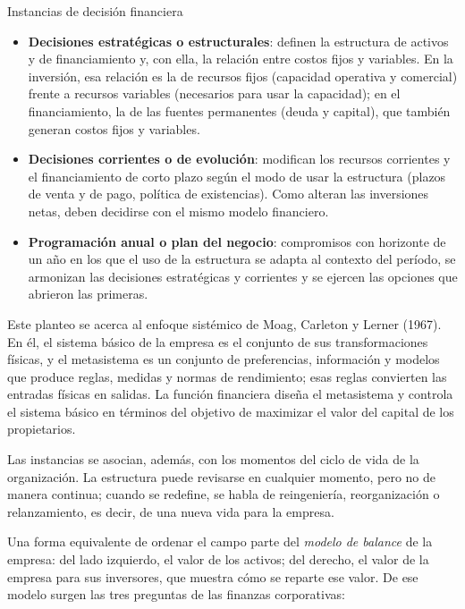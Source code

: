 \begin{definicion}{Instancias de decisión financiera}
\begin{itemize}
\item \textbf{Decisiones estratégicas o estructurales}: definen la estructura de activos y de financiamiento y, con ella, la relación entre costos fijos y variables. En la inversión, esa relación es la de recursos fijos (capacidad operativa y comercial) frente a recursos variables (necesarios para usar la capacidad); en el financiamiento, la de las fuentes permanentes (deuda y capital), que también generan costos fijos y variables.
\item \textbf{Decisiones corrientes o de evolución}: modifican los recursos corrientes y el financiamiento de corto plazo según el modo de usar la estructura (plazos de venta y de pago, política de existencias). Como alteran las inversiones netas, deben decidirse con el mismo modelo financiero.
\item \textbf{Programación anual o plan del negocio}: compromisos con horizonte de un año en los que el uso de la estructura se adapta al contexto del período, se armonizan las decisiones estratégicas y corrientes y se ejercen las opciones que abrieron las primeras.
\end{itemize}
\end{definicion}

Este planteo se acerca al enfoque sistémico de Moag, Carleton y Lerner (1967). En él, el sistema básico de la empresa es el conjunto de sus transformaciones físicas, y el metasistema es un conjunto de preferencias, información y modelos que produce reglas, medidas y normas de rendimiento; esas reglas convierten las entradas físicas en salidas. La función financiera diseña el metasistema y controla el sistema básico en términos del objetivo de maximizar el valor del capital de los propietarios.

Las instancias se asocian, además, con los momentos del ciclo de vida de la organización. La estructura puede revisarse en cualquier momento, pero no de manera continua; cuando se redefine, se habla de reingeniería, reorganización o relanzamiento, es decir, de una nueva vida para la empresa.

Una forma equivalente de ordenar el campo parte del \emph{modelo de balance} de la empresa: del lado izquierdo, el valor de los activos; del derecho, el valor de la empresa para sus inversores, que muestra cómo se reparte ese valor. De ese modelo surgen las tres preguntas de las finanzas corporativas:

